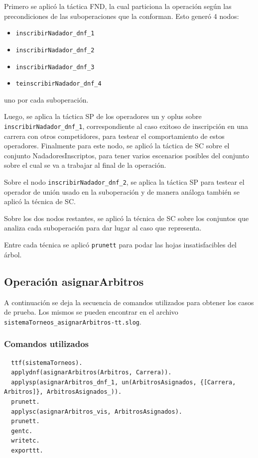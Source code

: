 \documentclass{article}
\begin{document}
Primero se aplicó la táctica FND, la cual particiona la operación según las precondiciones de las 
suboperaciones que la conforman. Esto generó 4 nodos: 
\begin{itemize}
  \item \verb|inscribirNadador_dnf_1|
  \item \verb|inscribirNadador_dnf_2|
  \item \verb|inscribirNadador_dnf_3|
  \item \verb|teinscribirNadador_dnf_4|
\end{itemize}

uno por cada suboperación.

Luego, se aplica la táctica SP de los operadores {\selectfont un} y {\selectfont oplus} sobre \verb|inscribirNadador_dnf_1|, correspondiente al caso exitoso
de inscripción en una carrera con otros competidores, para testear el comportamiento de estos operadores.
Finalmente para este nodo, se aplicó la táctica de SC sobre el conjunto {\selectfont NadadoresInscriptos},
para tener varios escenarios posibles del conjunto sobre el cual se va a trabajar al final de la operación.

Sobre el nodo \verb|inscribirNadador_dnf_2|, se aplica la táctica SP para testear el operador de unión usado 
en la suboperación y de manera análoga también se aplicó la técnica de SC.

Sobre los dos nodos restantes, se aplicó la técnica de SC sobre los conjuntos que analiza cada suboperación
para dar lugar al caso que representa.

Entre cada técnica se aplicó \verb|prunett| para podar las hojas insatisfacibles del árbol. 


\subsection*{Operación asignarArbitros}
A continuación se deja la secuencia de comandos utilizados para obtener los casos de prueba.
Los mismos se pueden encontrar en el archivo \verb|sistemaTorneos_asignarArbitros-tt.slog|.

\subsubsection*{Comandos utilizados}

\begin{verbatim}
  ttf(sistemaTorneos).
  applydnf(asignarArbitros(Arbitros, Carrera)).
  applysp(asignarArbitros_dnf_1, un(ArbitrosAsignados, {[Carrera, Arbitros]}, ArbitrosAsignados_)).
  prunett.
  applysc(asignarArbitros_vis, ArbitrosAsignados).
  prunett.
  gentc.
  writetc.
  exporttt.
\end{verbatim}
\end{document}
